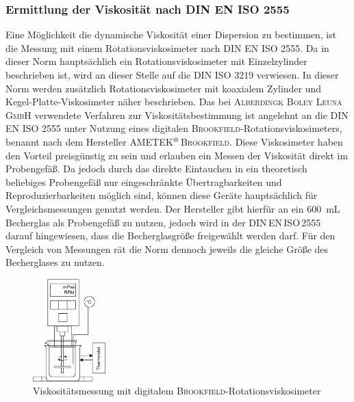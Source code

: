 \subsubsection{Ermittlung der Viskosität nach DIN EN ISO 2555}
Eine Möglichkeit die dynamische Viskosität einer Dispersion zu bestimmen, ist die Messung mit einem Rotationsviskosimeter nach DIN EN ISO 2555. Da in dieser Norm hauptsächlich ein Rotationsviskosimeter mit Einzelzylinder beschrieben ist, wird an dieser Stelle auf die DIN ISO 3219 verwiesen. In dieser Norm werden zusätzlich Rotationsviskosimeter mit koaxialem Zylinder und Kegel-Platte-Viskosimeter näher beschrieben. \cite{DINDeutschesInstitutfurNormunge.V..Februar2013, DINDeutschesInstitutfurNormunge.V..September2018} \linebreak
Das bei \textsc{Alberdingk Boley Leuna GmbH} verwendete Verfahren zur Viskositätsbestimmung ist angelehnt an die DIN EN ISO 2555 unter Nutzung eines digitalen \textsc{Brookfield}-Rotationsviskosimeters, benannt nach dem Hersteller \textsc{AMETEK$^\text{\textregistered}$\,Brookfield}. Diese Viskosimeter haben den Vorteil preisgünstig zu sein und erlauben ein Messen der Viskosität direkt im Probengefäß. Da jedoch durch das direkte Eintauchen in ein theoretisch beliebiges Probengefäß nur eingeschränkte Übertragbarkeiten und Reproduzierbarkeiten möglich sind, können diese Geräte hauptsächlich für Vergleichsmessungen genutzt werden.  Der Hersteller gibt hierfür an ein \SI{600}{\milli \liter} Becherglas als Probengefäß zu nutzen, jedoch wird in der DIN\,EN\,ISO\,2555 darauf hingewiesen, dass die Becherglasgröße freigewählt werden darf. Für den Vergleich von Messungen rät die Norm dennoch jeweils die gleiche Größe des Becherglases zu nutzen. \cite{ROMPPRedaktion.2008, brookfield_31.01.2022, DINDeutschesInstitutfurNormunge.V..September2018}


\begin{figure}[h!]
	\centering
	\includegraphics[width=0.25\textwidth]{img/viskosimeter}
	\caption{Viskositätsmessung mit digitalem \textsc{Brookfield}-Rotationsviskosimeter}
	\label{fig: viskosimeter}
\end{figure}
\FloatBarrier

